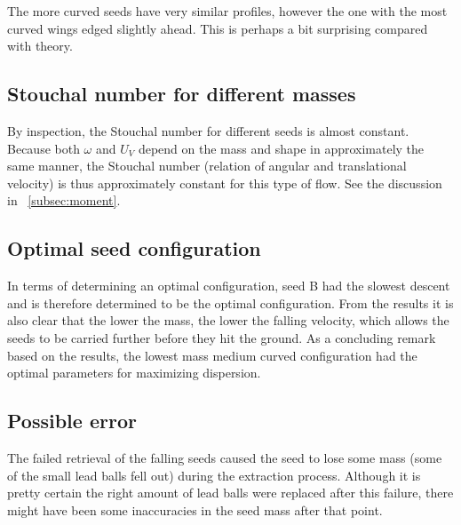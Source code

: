 \documentclass[aps,reprint]{revtex4-1}
\newcommand\blankpage{%
  \null
  \thispagestyle{empty}%
  \addtocounter{page}{-1}%
  \newpage}
\begin{document}
The more curved seeds have very similar profiles, however the one with the most
curved wings edged slightly ahead. This is perhaps a bit surprising compared
with theory.
\subsection{Stouchal number for different masses}
By inspection, the Stouchal number for different seeds is almost constant.
Because both $\omega$ and $U_V$ depend on the mass and shape in approximately the same manner,
the Stouchal number (relation of angular and translational velocity) is thus
approximately constant for this type of flow. See the discussion in ~\ref{subsec:moment}.

\subsection{Optimal seed configuration}
In terms of determining an optimal configuration, seed B had the slowest descent
and is therefore determined to be the optimal configuration. From the results
it is also clear that the lower the mass, the lower the falling velocity, which
allows the seeds to be carried further before they hit the ground. As a concluding
remark based on the results, the lowest mass medium curved configuration had the
optimal parameters for maximizing dispersion.
\subsection{Possible error}
The failed retrieval of the falling seeds caused the seed to lose some mass
(some of the small lead balls fell out) during the extraction process. Although
it is pretty certain the right amount of lead balls were replaced after
this failure, there might have been some inaccuracies in the seed mass after that
point.
\blankpage
\end{document}
